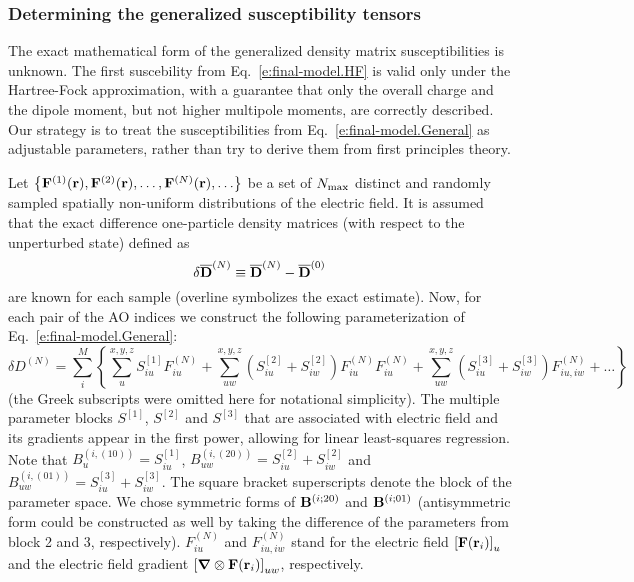 \documentclass[aip,graphicx]{revtex4-1}
\newcommand{\BM}[1]{\bm{#1}}
\begin{document}
\subsubsection{Determining the generalized susceptibility tensors}

The exact mathematical form of the generalized density matrix susceptibilities is unknown. 
The first suscebility from Eq.~\eqref{e:final-model.HF} is valid only under the Hartree\hyp{}Fock
approximation, with a guarantee that only the overall charge and the dipole moment, 
but not higher multipole moments, are correctly described.
Our strategy is to treat the susceptibilities from Eq.~\eqref{e:final-model.General}
as adjustable parameters, rather than try to derive them from first principles theory.

Let  
$\left\{ {\bf F}^{(1)}({\bf r}), {\bf F}^{(2)}({\bf r}), \ldots, {\bf F}^{(N)}({\bf r}), \ldots \right\}$ 
be a set of $N_{\rm max}$ distinct and randomly sampled 
spatially non\hyp{}uniform distributions of the electric field. It is assumed that
the exact difference one\hyp{}particle density matrices (with respect to the unperturbed state)
defined as
%
\begin{equation}
 \delta \overline{\bf D}^{(N)} \equiv \overline{\bf D}^{(N)} - \overline{\bf D}^{(0)}
\end{equation}
%
are known for each sample (overline symbolizes the exact estimate).
Now, for each pair of the AO indices we construct the following 
parameterization of Eq.~\eqref{e:final-model.General}:
%
\begin{equation}\label{e:final-model.General.Parameters}
 \delta D^{(N)} = \sum_{i }^M \left\{ 
                              \sum_u^{x,y,z} S^{[1]}_{iu} F_{iu}^{(N)} 
                +             \sum_{uw}^{x,y,z} \left( S^{[2]}_{iu} + S^{[2]}_{iw} \right) F_{iu}^{(N)} F_{iu}^{(N)}
                +             \sum_{uw}^{x,y,z} \left( S^{[3]}_{iu} + S^{[3]}_{iw}\right) F_{iu,iw}^{(N)}
                        + \ldots \right\}
\end{equation}
%
(the Greek subscripts were omitted here for notational simplicity).
The multiple parameter blocks 
$S^{[1]}$, $S^{[2]}$ and $S^{[3]}$ that are associated with electric field and its gradients
appear in the first power, allowing for linear least\hyp{}squares regression.
Note that $B_u^{(i,(10))} = S^{[1]}_{iu}$, $B_{uw}^{(i,(20))} = S^{[2]}_{iu} + S^{[2]}_{iw}$
and $B_{uw}^{(i,(01))} = S^{[3]}_{iu} + S^{[3]}_{iw}$. The square bracket superscripts 
denote the block of the parameter space. We chose symmetric forms of ${\bf B}^{(i;20)}$
and ${\bf B}^{(i;01)}$ (antisymmetric form could be constructed as well by taking the difference
of the parameters from block 2 and 3, respectively). $F_{iu}^{(N)}$ and $F_{iu,iw}^{(N)}$ 
stand for the electric field $\left[ {\bf F}({\bf r}_i)\right]_u$ and the electric field
gradient $\left[ {\BM \nabla} \otimes {\bf F}({\bf r}_i) \right]_{uw}$, respectively.
\end{document}
